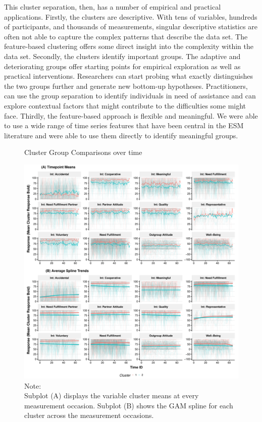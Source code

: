 This cluster separation, then, has a number of empirical and practical
applications. Firstly, the clusters are descriptive. With tens of
variables, hundreds of participants, and thousands of measurements,
singular descriptive statistics are often not able to capture the
complex patterns that describe the data set. The feature-based
clustering offers some direct insight into the complexity within the
data set. Secondly, the clusters identify important groups. The adaptive
and deteriorating groups offer starting points for empirical exploration
as well as practical interventions. Researchers can start probing what
exactly distinguishes the two groups further and generate new bottom-up
hypotheses. Practitioners, can use the group separation to identify
individuals in need of assistance and can explore contextual factors
that might contribute to the difficulties some might face. Thirdly, the
feature-based approach is flexible and meaningful. We were able to use a
wide range of time series features that have been central in the ESM
literature and were able to use them directly to identify meaningful
groups.

\begin{figure}[!ht] %
  \caption{Cluster Group Comparisons over time}
  \label{fig:clusterTs}
  \centering\includegraphics[width=\textwidth]{figures/clusterTsComb.pdf}
  \caption*{Note: \\
  Subplot (A) displays the variable cluster means at every measurement occasion. Subplot (B) shows the GAM spline for each cluster across the measurement occasions.}
\end{figure}
